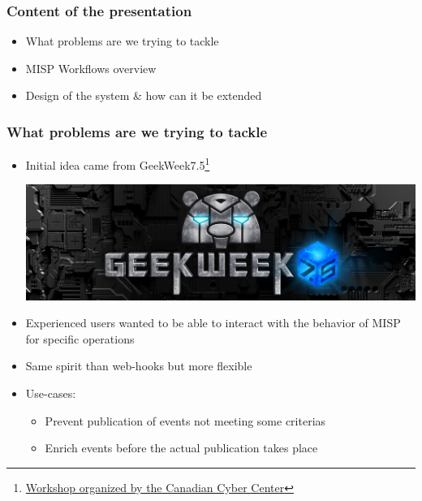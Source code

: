 
\begin{frame}[t,plain]
\titlepage
\end{frame}

\begin{frame}
    \frametitle{Content of the presentation}
    \begin{itemize}
        \item What problems are we trying to tackle
        \item MISP Workflows overview
        \item Design of the system \& how can it be extended
    \end{itemize}
\end{frame}

\begin{frame}
    \frametitle{What problems are we trying to tackle}
    \begin{itemize}
        \item Initial idea came from GeekWeek7.5\footnote{\href{https://cyber.gc.ca/en/events/geekweek-75}{Workshop organized by the Canadian Cyber Center}}
        \begin{center}
            \includegraphics[width=0.5\linewidth]{pictures/geekweek75.jpg}
        \end{center}
        \item Experienced users wanted to be able to interact with the behavior of MISP for specific operations
        \item Same spirit than web-hooks but more flexible
        \item Use-cases:
        \begin{itemize}
            \item Prevent publication of events not meeting some criterias
            \item Enrich events before the actual publication takes place
        \end{itemize}
    \end{itemize}
\end{frame}

